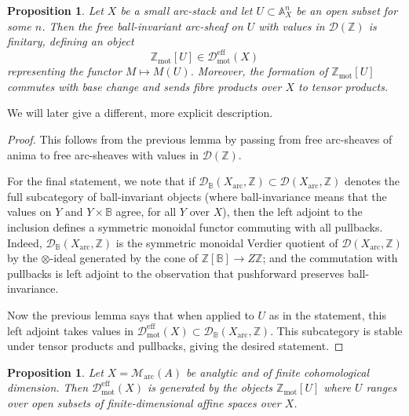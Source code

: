 \documentclass[11pt]{amsart}
\numberwithin{equation}{section}
\numberwithin{theorem}{section}
\newtheorem{proposition}[theorem]{Proposition}
\theoremstyle{definition}
\begin{document}
\begin{proposition}\label{prop:freemotivicsheaves} Let $X$ be a small arc-stack and let $U\subset \mathbb A^n_X$ be an open subset for some $n$. Then the free ball-invariant arc-sheaf on $U$ with values in $\mathcal D(\mathbb Z)$ is finitary, defining an object
\[
\mathbb Z_{\mathrm{mot}}[U]\in \mathcal D_{\mathrm{mot}}^{\mathrm{eff}}(X)
\]
representing the functor $M\mapsto M(U)$. Moreover, the formation of $\mathbb Z_{\mathrm{mot}}[U]$ commutes with base change and sends fibre products over $X$ to tensor products.
\end{proposition}

We will later give a different, more explicit description.

\begin{proof} This follows from the previous lemma by passing from free arc-sheaves of anima to free arc-sheaves with values in $\mathcal D(\mathbb Z)$.

For the final statement, we note that if $\mathcal D_{\mathbb B}(X_{\mathrm{arc}},\mathbb Z)\subset \mathcal D(X_{\mathrm{arc}},\mathbb Z)$ denotes the full subcategory of ball-invariant objects (where ball-invariance means that the values on $Y$ and $Y\times \mathbb B$ agree, for all $Y$ over $X$), then the left adjoint to the inclusion defines a symmetric monoidal functor commuting with all pullbacks. Indeed, $\mathcal D_{\mathbb B}(X_{\mathrm{arc}},\mathbb Z)$ is the symmetric monoidal Verdier quotient of $\mathcal D(X_{\mathrm{arc}},\mathbb Z)$ by the $\otimes$-ideal generated by the cone of $\mathbb Z[\mathbb B]\to Z\mathbb Z$; and the commutation with pullbacks is left adjoint to the observation that pushforward preserves ball-invariance.

Now the previous lemma says that when applied to $U$ as in the statement, this left adjoint takes values in $\mathcal D_{\mathrm{mot}}^{\mathrm{eff}}(X)\subset \mathcal D_{\mathbb B}(X_{\mathrm{arc}},\mathbb Z)$. This subcategory is stable under tensor products and pullbacks, giving the desired statement.
\end{proof}

\begin{proposition}\label{prop:freemotivicsheavesgenerate} Let $X=\mathcal M_{\mathrm{arc}}(A)$ be analytic and of finite cohomological dimension. Then $\mathcal D_{\mathrm{mot}}^{\mathrm{eff}}(X)$ is generated by the objects $\mathbb Z_{\mathrm{mot}}[U]$ where $U$ ranges over open subsets of finite-dimensional affine spaces over $X$.
\end{proposition}
\end{document}
